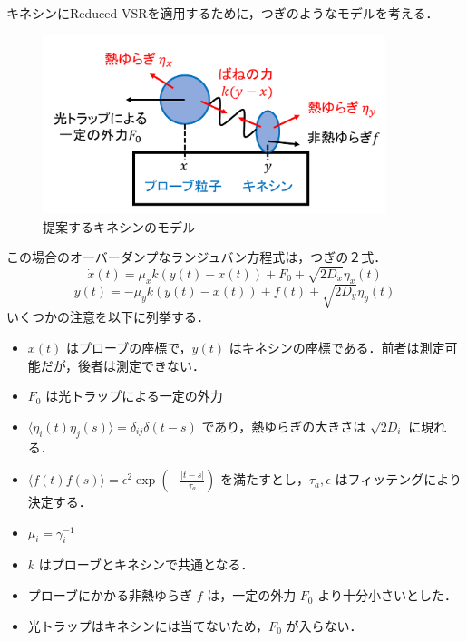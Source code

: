 \documentclass{jsarticle}
\numberwithin{equation}{section}
\theoremstyle{definition}
\newcommand{\ave}[1]{\langle #1 \rangle}
\begin{document}
キネシンにReduced-VSRを適用するために，つぎのようなモデルを考える．

\begin{figure}[H]
  \begin{center}
  \includegraphics[width=10cm]{kinesine_suggest.png}
  \end{center}
  \caption{提案するキネシンのモデル}
\end{figure}

この場合のオーバーダンプなランジュバン方程式は，つぎの２式．
\begin{equation}
  \dot{x}(t) = \mu_x k (y(t) - x(t)) + F_0 + \sqrt{2D_x} \eta_x (t)
\end{equation}
\begin{equation}
  \dot{y}(t) = - \mu_y k (y(t) - x(t)) + f(t) + \sqrt{2D_y} \eta_y (t)
\end{equation}
いくつかの注意を以下に列挙する．
\begin{itemize}
  \item $x(t)$ はプローブの座標で，$y(t)$ はキネシンの座標である．前者は測定可能だが，後者は測定できない．
  \item $F_0$ は光トラップによる一定の外力
  \item $\ave{\eta_i (t) \eta_j (s)} = \delta_{ij} \delta (t-s)$ であり，熱ゆらぎの大きさは $\sqrt{2D_i}$ に現れる．
  \item $\ave{f(t) f(s)} = \epsilon^2 \exp( - \frac{|t-s|}{\tau_a} )$ を満たすとし，$\tau_a, \epsilon$ はフィッテングにより決定する．
  \item $\mu_i = \gamma_i^{-1}$
  \item $k$ はプローブとキネシンで共通となる．
  \item プローブにかかる非熱ゆらぎ $f$ は，一定の外力 $F_0$ より十分小さいとした．
  \item 光トラップはキネシンには当てないため，$F_0$ が入らない．
\end{itemize}
\end{document}
